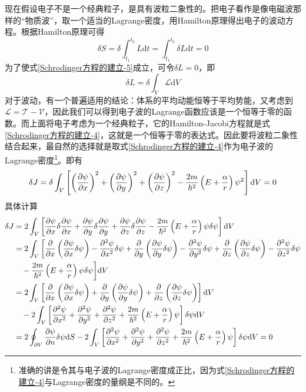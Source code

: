 现在假设电子不是一个经典粒子，是具有波粒二象性的。把电子看作是像电磁波那样的“物质波”，取一个适当的Lagrange密度，用Hamilton原理得出电子的波动方程。根据Hamilton原理可得
\begin{equation}
	\delta S = \delta \int_{t_1}^{t_2} L \mathrm{d}t = \int_{t_1}^{t_2} \delta L \mathrm{d}t = 0
	\label{Schrodinger方程的建立-5}
\end{equation}
为了使式\eqref{Schrodinger方程的建立-5}成立，可令$\delta L = 0$，即
\begin{equation}
	\delta L = \delta \int_V \mathscr{L}\mathrm{d}V
	\label{Schrodinger方程的建立-6}
\end{equation}
对于波动，有一个普遍适用的结论：体系的平均动能恒等于平均势能，又考虑到$\mathscr{L} = \mathscr{T}-\mathscr{V}$，因此我们可以得到电子波的Lagrange函数应该是一个恒等于零的函数。而上面将电子考虑为一个经典粒子，它的Hamilton-Jacobi方程就是式\eqref{Schrodinger方程的建立-4}，这就是一个恒等于零的表达式。因此要将波粒二象性结合起来，最自然的选择就是取式\eqref{Schrodinger方程的建立-4}作为电子波的Lagrange密度\footnote{准确的讲是令其与电子波的Lagrange密度成正比，因为式\eqref{Schrodinger方程的建立-4}与Lagrange密度的量纲是不同的。}。即有
\begin{equation}
	\delta J = \delta \int_V \left[\left(\frac{\partial \psi}{\partial x}\right)^2 + \left(\frac{\partial \psi}{\partial y}\right)^2 + \left(\frac{\partial \psi}{\partial z}\right)^2 - \frac{2m}{\hbar^2}\left(E+\frac{\alpha}{r}\right)\psi^2\right] \mathrm{d}V = 0
	\label{Schrodinger方程的建立-7}
\end{equation}
具体计算
\begin{align*}
	\delta J & = 2\int_V \left[\frac{\partial \psi}{\partial x} \delta \frac{\partial \psi}{\partial x} + \frac{\partial \psi}{\partial y} \delta \frac{\partial \psi}{\partial y} + \frac{\partial \psi}{\partial z} \delta \frac{\partial \psi}{\partial z} - \frac{2m}{\hbar^2}\left(E+\frac{\alpha}{r}\right) \psi\delta \psi\right] \mathrm{d}V \\
	& = 2\int_V \bigg[\frac{\partial}{\partial x}\left(\frac{\partial \psi}{\partial x}\delta \psi\right) - \frac{\partial^2 \psi}{\partial x^2} \delta \psi + \frac{\partial}{\partial y}\left(\frac{\partial \psi}{\partial y}\delta \psi\right) - \frac{\partial^2 \psi}{\partial y^2} \delta \psi + \frac{\partial}{\partial z}\left(\frac{\partial \psi}{\partial z}\delta \psi\right) - \frac{\partial^2 \psi}{\partial z^2} \delta \psi \\
	& \quad {} - \frac{2m}{\hbar^2}\left(E+\frac{\alpha}{r}\right)\psi \delta\psi \bigg] \mathrm{d}V \\
	& = 2\int_V \left[\frac{\partial}{\partial x}\left(\frac{\partial \psi}{\partial x}\delta \psi\right) + \frac{\partial}{\partial y}\left(\frac{\partial \psi}{\partial y}\delta \psi\right) + \frac{\partial}{\partial z}\left(\frac{\partial \psi}{\partial z}\delta \psi\right) \right] \mathrm{d}V \\
	& \quad {} - 2\int_V \left[\frac{\partial^2 \psi}{\partial x^2} + \frac{\partial^2 \psi}{\partial y^2} + \frac{\partial^2 \psi}{\partial z^2} + \frac{2m}{\hbar^2}\left(E+\frac{\alpha}{r}\right)\psi \right] \delta\psi \mathrm{d}V \\
	& = 2\oint_{\partial V} \frac{\partial \psi}{\partial n} \delta \psi \mathrm{d}S - 2\int_V \left[\frac{\partial^2 \psi}{\partial x^2} + \frac{\partial^2 \psi}{\partial y^2} + \frac{\partial^2 \psi}{\partial z^2} + \frac{2m}{\hbar^2}\left(E+\frac{\alpha}{r}\right)\psi \right] \delta\psi \mathrm{d}V = 0
\end{align*}
